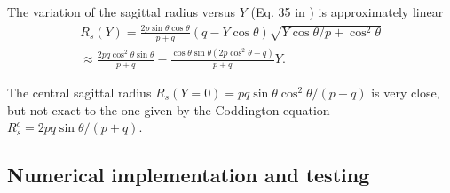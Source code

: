 \documentclass{iucr}              %
\newcommand{\inred}[1]{{\color{red}#1}}
\begin{document}
The variation of the sagittal radius versus $Y$  (Eq. 35 in \cite{part2}) is approximately linear
\begin{multline}
\label{eq:sagRadius}
R_s(Y) = \frac{2  p \sin\theta \cos\theta}{p + q} (q - Y \cos\theta)   \sqrt{Y \cos\theta / p + \cos^2\theta} \\
\approx 
\frac{2p q \cos^2\theta \sin\theta  }{p + q} - 
\frac{\cos\theta \sin\theta (2 p \cos^2\theta - q)}{p + q} Y.
\end{multline}

The central sagittal radius $R_s(Y=0)=p q \sin\theta \cos^2\theta/ (p+q)$ is very close, but not exact to the one given by the Coddington equation $R_s^c=2 p q \sin\theta / (p+q)$.


\subsection{Numerical implementation and testing}
\label{sec:oasys}

\end{document}
